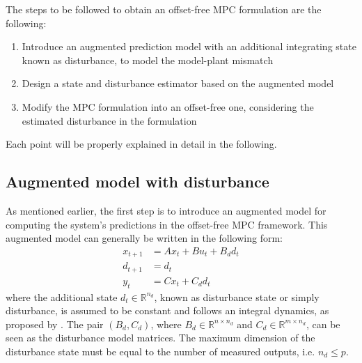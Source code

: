 \documentclass[a4paper,12pt,oneside]{book}
\begin{document}
The steps to be followed to obtain an offset-free MPC formulation are the following:
\begin{enumerate}
	\item Introduce an augmented prediction model with an additional integrating state known as disturbance, to model the model-plant mismatch
	\item Design a state and disturbance estimator based on the augmented model
	\item Modify the MPC formulation into an offset-free one, considering the estimated disturbance in the formulation
\end{enumerate}
Each point will be properly explained in detail in the following.

\subsection*{Augmented model with disturbance}
As mentioned earlier, the first step is to introduce an augmented model for computing the system's predictions in the offset-free MPC framework. 
This augmented model can generally be written in the following form:
\begin{equation}
\begin{aligned}
    x_{t+1} &= A x_t + B u_t + B_d d_t \\
    d_{t+1} &= d_t \\
    y_t &= C x_t + C_d d_t
\end{aligned}
\label{Augmented_model}
\end{equation}
where the additional state $d_t \in \mathbb{R}^{n_d}$, known as disturbance state or simply disturbance, is assumed to be constant and follows an integral dynamics, as proposed by \cite{pannocchia2003disturbance}. 
The pair $(B_d, C_d)$, where $B_d \in \mathbb{R}^{n \times n_d}$ and $C_d \in \mathbb{R}^{m \times n_d}$, can be seen as the disturbance model matrices.
The maximum dimension of the disturbance state must be equal to the number of measured outputs, i.e. $n_d \leq p$.
\end{document}
